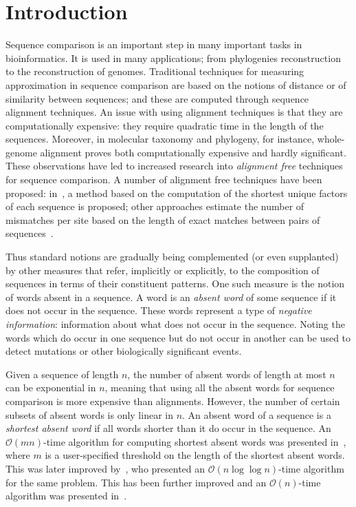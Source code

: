 \documentclass{llncs}
\newcommand{\cO}{\mathcal{O}}
\begin{document}
\section{Introduction}
\label{sec:intro}
  Sequence comparison is an important step in many important tasks in bioinformatics.
  It is used in many applications; from phylogenies reconstruction to the reconstruction of genomes.
  Traditional techniques for measuring approximation in sequence comparison are based on the notions of distance or of similarity between sequences;
  and these are computed through sequence alignment techniques.
  An issue with using alignment techniques is that they are computationally expensive: they require quadratic time in the length of the sequences.
  Moreover, in molecular taxonomy and phylogeny, for instance, whole-genome alignment proves both computationally expensive and hardly significant.
  These observations have led to increased research into \textit{alignment free} techniques for sequence comparison.
  A number of alignment free techniques have been proposed: in~\cite{HauboldPMW05}, a 
  method based on the computation of the shortest unique factors of each sequence is proposed; other approaches estimate the number of mismatches per site based on the length 
  of exact matches between pairs of sequences~\cite{Domazet-Loso:2009:EEP:1671627.1671629}.
  
  Thus standard notions are gradually being complemented (or even supplanted) by other measures that refer, implicitly or explicitly, to the 
  composition of sequences in terms of their constituent patterns. One such measure is the notion of words absent in a sequence.
  A word is an \textit{absent word} of some sequence if it does not occur in the sequence. 
  These words represent a type of \textit{negative information}: information about what does not occur in the sequence.
  Noting the words which do occur in one sequence but do not occur in another can be used to detect mutations or other biologically significant events.

  Given a sequence of length $n$, the number of absent words of length at most $n$ can be exponential in $n$, meaning that using all the absent words for 
  sequence comparison is more expensive than alignments. However, the number of certain subsets of absent words is only linear in $n$.
  An absent word of a sequence is a \textit{shortest absent word} if all words shorter than it do occur in the sequence.
  An $\cO(mn)$-time algorithm for computing shortest absent words was presented in~\cite{Hampikian_absentsequences:}, 
  where $m$ is a user-specified threshold on the length of the shortest absent words. This was later improved by~\cite{abwords}, who presented an $\cO(n \log \log n)$-time algorithm for the same problem. 
  This has been further improved and an $\cO(n)$-time algorithm was presented in~\cite{Wu2010596}.
  
\end{document}
